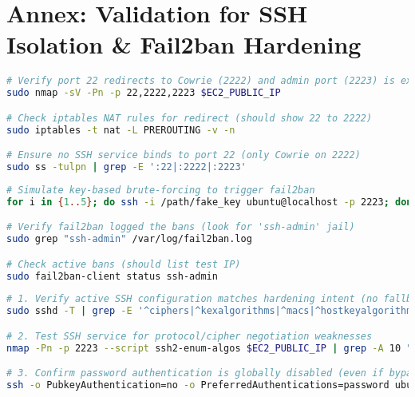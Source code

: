 \newpage

\section{Annex: Validation for SSH Isolation \& Fail2ban Hardening}  
\label{annex:network}
\begin{lstlisting}[language=bash, label={annexes:network}, caption={Network Isolation Verification}]  
# Verify port 22 redirects to Cowrie (2222) and admin port (2223) is exclusive  
sudo nmap -sV -Pn -p 22,2222,2223 $EC2_PUBLIC_IP  

# Check iptables NAT rules for redirect (should show 22 to 2222)  
sudo iptables -t nat -L PREROUTING -v -n  

# Ensure no SSH service binds to port 22 (only Cowrie on 2222)  
sudo ss -tulpn | grep -E ':22|:2222|:2223'  
\end{lstlisting}  




\begin{lstlisting}[language=bash, label={annexes:fail2ban}, caption={Fail2ban Efficacy Testing}]  
# Simulate key-based brute-forcing to trigger fail2ban  
for i in {1..5}; do ssh -i /path/fake_key ubuntu@localhost -p 2223; done  

# Verify fail2ban logged the bans (look for 'ssh-admin' jail)  
sudo grep "ssh-admin" /var/log/fail2ban.log  

# Check active bans (should list test IP)  
sudo fail2ban-client status ssh-admin  
\end{lstlisting}  






\begin{lstlisting}[language=bash, label={annexes:ssh-hardening}, caption={SSH Service Hardening Validation}]  
# 1. Verify active SSH configuration matches hardening intent (no fallback to weak protocols)  
sudo sshd -T | grep -E '^ciphers|^kexalgorithms|^macs|^hostkeyalgorithms'  

# 2. Test SSH service for protocol/cipher negotiation weaknesses  
nmap -Pn -p 2223 --script ssh2-enum-algos $EC2_PUBLIC_IP | grep -A 10 "algorithm negotiation"  

# 3. Confirm password authentication is globally disabled (even if bypass attempted)  
ssh -o PubkeyAuthentication=no -o PreferredAuthentications=password ubuntu@$EC2_PUBLIC_IP -p 2223  
\end{lstlisting}  

